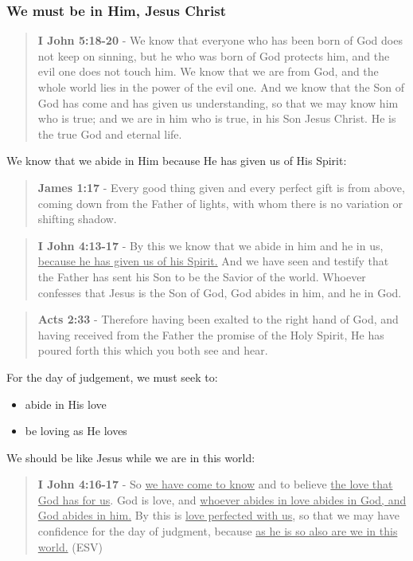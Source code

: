 \documentclass[11pt]{article}
\begin{document}
\subsubsection{We must be in Him, Jesus Christ}
\label{sec:orgb7d2bc5}
\begin{quote}
\textbf{I John 5:18-20} - We know that everyone who has been born of God does not keep on sinning, but he who was born of God protects him, and the evil one does not touch him. We know that we are from God, and the whole world lies in the power of the evil one. And we know that the Son of God has come and has given us understanding, so that we may know him who is true; and we are in him who is true, in his Son Jesus Christ. He is the true God and eternal life.
\end{quote}

We know that we abide in Him because He has given us of His Spirit:

\begin{quote}
\textbf{James 1:17} - Every good thing given and every perfect gift is from above, coming down from the Father of lights, with whom there is no variation or shifting shadow.
\end{quote}

\begin{quote}
\textbf{I John 4:13-17} - By this we know that we abide in him and he in us, \uline{because he has given us of his Spirit.} And we have seen and testify that the Father has sent his Son to be the Savior of the world. Whoever confesses that Jesus is the Son of God, God abides in him, and he in God.
\end{quote}

\begin{quote}
\textbf{Acts 2:33} - Therefore having been exalted to the right hand of God, and having received from the Father the promise of the Holy Spirit, He has poured forth this which you both see and hear.
\end{quote}

For the day of judgement, we must seek to:
\begin{itemize}
\item abide in His love
\item be loving as He loves
\end{itemize}

We should be like Jesus while we are in this world:

\begin{quote}
\textbf{I John 4:16-17} - So \uline{we have come to know} and to believe \uline{the love that God has for us}. God is love, and \uline{whoever abides in love abides in God, and God abides in him.} By this is \uline{love perfected with us}, so that we may have confidence for the day of judgment, because \uline{as he is so also are we in this world.} (ESV)
\end{quote}
\end{document}

